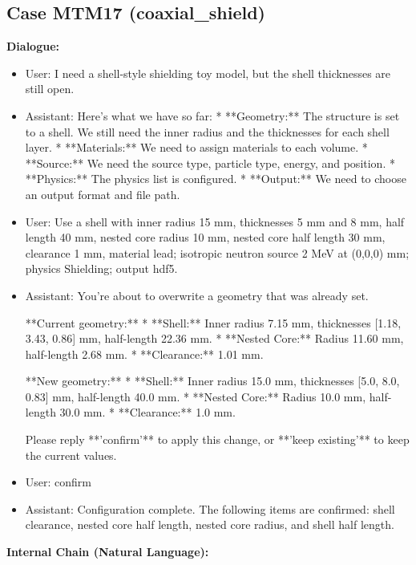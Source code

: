 \documentclass[11pt]{ctexart}
\begin{document}
\subsection{Case MTM17 (coaxial\_shield)}
\textbf{Dialogue:}
\begin{itemize}
\item User: I need a shell-style shielding toy model, but the shell thicknesses are still open.
\item Assistant: Here's what we have so far:
*   **Geometry:** The structure is set to a shell. We still need the inner radius and the thicknesses for each shell layer.
*   **Materials:** We need to assign materials to each volume.
*   **Source:** We need the source type, particle type, energy, and position.
*   **Physics:** The physics list is configured.
*   **Output:** We need to choose an output format and file path.
\item User: Use a shell with inner radius 15 mm, thicknesses 5 mm and 8 mm, half length 40 mm, nested core radius 10 mm, nested core half length 30 mm, clearance 1 mm, material lead; isotropic neutron source 2 MeV at (0,0,0) mm; physics Shielding; output hdf5.
\item Assistant: You're about to overwrite a geometry that was already set.

**Current geometry:**
*   **Shell:** Inner radius 7.15 mm, thicknesses [1.18, 3.43, 0.86] mm, half-length 22.36 mm.
*   **Nested Core:** Radius 11.60 mm, half-length 2.68 mm.
*   **Clearance:** 1.01 mm.

**New geometry:**
*   **Shell:** Inner radius 15.0 mm, thicknesses [5.0, 8.0, 0.83] mm, half-length 40.0 mm.
*   **Nested Core:** Radius 10.0 mm, half-length 30.0 mm.
*   **Clearance:** 1.0 mm.

Please reply **'confirm'** to apply this change, or **'keep existing'** to keep the current values.
\item User: confirm
\item Assistant: Configuration complete. The following items are confirmed: shell clearance, nested core half length, nested core radius, and shell half length.
\end{itemize}
\textbf{Internal Chain (Natural Language):}
\end{document}
